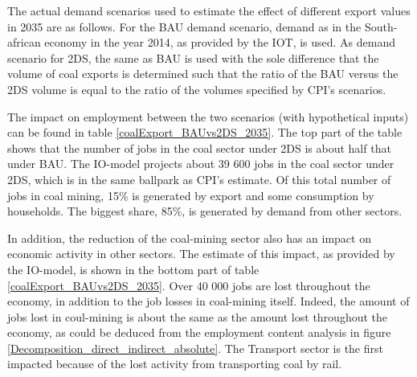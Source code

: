 \documentclass[12pt,english]{article}
\newcommand{\mli}[1]{\mathit{#1}}
\begin{document}
The actual demand scenarios used to estimate the effect of different export values in 2035 are as follows. For the BAU demand scenario, demand as in the South-african economy in the year 2014, as provided by the IOT, is used. As demand scenario for 2DS, the same as BAU is used with the sole difference that the volume of coal exports is determined such that the ratio of the BAU versus the 2DS volume is equal to the ratio of the volumes specified by CPI's scenarios.


The impact on employment between the two scenarios (with hypothetical inputs) can be found in table \ref{coalExport_BAUvs2DS_2035}. The top part of the table shows that the number of jobs in the coal sector under 2DS is about half that under BAU. The IO-model projects about 39 600 jobs in the coal sector under 2DS, which is in the same ballpark as CPI's estimate. Of this total number of jobs in coal mining, 15\% is generated by export and some consumption by households. The biggest share, 85\%, is generated by demand from other sectors. 

In addition, the reduction of the coal-mining sector also has an impact on economic activity in other sectors. %
The estimate of this impact, as provided by the IO-model, is shown in the bottom part of table \ref{coalExport_BAUvs2DS_2035}. Over 40 000
jobs are lost throughout the economy, in addition to the job losses in coal-mining itself. Indeed, the amount of jobs lost in coul-mining is about the same as the amount lost throughout the economy, as could be deduced from the employment content analysis in figure \ref{Decomposition_direct_indirect_absolute}. The Transport sector is the first impacted because of the lost activity from transporting coal by rail. 
\end{document}
